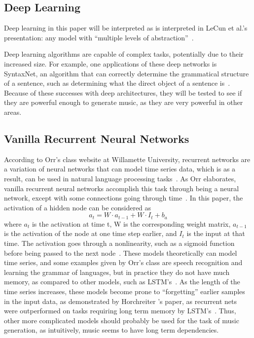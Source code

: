 \documentclass[12pt]{article}
\begin{document}
\subsection{Deep Learning}
Deep learning in this paper will be interpreted as is interpreted in LeCun et
al.'s presentation: any model with ``multiple levels of
abstraction''~\cite{dlppt}.

Deep learning algorithms are capable of complex tasks, potentially due to their
increased size. For example, one applications of these deep networks is
SyntaxNet, an algorithm that can correctly determine the grammatical structure
of a sentence, such as determining what the direct object of a sentence
is~\cite{syntaxnet}. Because of these successes with deep architectures, they
will be tested to see if they are powerful enough to generate music, as they are
very powerful in other areas.


\subsection{Vanilla Recurrent Neural Networks}
According to Orr's class website at Willamette University, recurrent networks
are a variation of neural networks that can model time series data, which is as
a result, can be used in natural language processing tasks~\cite{rnnintro}. As
Orr elaborates, vanilla recurrent neural networks accomplish this task through
being a neural network, except with some connections going through
time~\cite{rnnintro}. In this paper, the activation of a hidden node can be considered as
$$a_t = W\cdot a_{t-1} + W\cdot I_t + b_a$$
where $a_t$ is the activation at time t, W is the corresponding weight matrix,
$a_{t-1}$ is the activation of the node at one time step earlier, and $I_t$ is
the input at that time. The activation goes through a nonlinearity, such as a
sigmoid function before being passed to the next node~\cite{rnnintro}. These
models theoretically can model time series, and some examples given by Orr's
class are speech recognition and learning the grammar of languages, but in
practice they do not have much memory, as compared to other models, such as
LSTM's~\cite{rnnintro}\cite{lstm}. As the length of the time series increases,
these models become prone to ``forgetting'' earlier samples in the input data,
as demonstrated by Horchreiter 's paper, as recurrent nets were outperformed on
tasks requiring long term memory by LSTM's~\cite{lstm}. Thus, other more
complicated models should probably be used for the task of music generation, as
intuitively, music seems to have long term dependencies.
\end{document}
